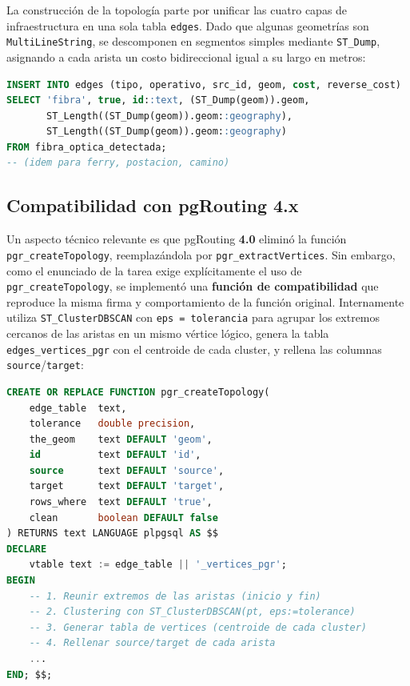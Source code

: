 \documentclass[12pt,a4paper]{article}
\begin{document}
La construcción de la topología parte por unificar las cuatro capas de
infraestructura en una sola tabla \texttt{edges}.  Dado que algunas
geometrías son \texttt{MultiLineString}, se descomponen en segmentos
simples mediante \texttt{ST\_Dump}, asignando a cada arista un costo
bidireccional igual a su largo en metros:

\begin{lstlisting}[language=SQL,caption={Tabla unificada de aristas (02\_topologia.sql)}]
INSERT INTO edges (tipo, operativo, src_id, geom, cost, reverse_cost)
SELECT 'fibra', true, id::text, (ST_Dump(geom)).geom,
       ST_Length((ST_Dump(geom)).geom::geography),
       ST_Length((ST_Dump(geom)).geom::geography)
FROM fibra_optica_detectada;
-- (idem para ferry, postacion, camino)
\end{lstlisting}

\subsection{Compatibilidad con pgRouting 4.x}

Un aspecto técnico relevante es que pgRouting \textbf{4.0} eliminó la
función \texttt{pgr\_createTopology}, reemplazándola por
\texttt{pgr\_extractVertices}.  Sin embargo, como el enunciado de la tarea
exige explícitamente el uso de \texttt{pgr\_createTopology}, se implementó
una \textbf{función de compatibilidad} que reproduce la misma firma y
comportamiento de la función original.  Internamente utiliza
\texttt{ST\_ClusterDBSCAN} con \texttt{eps = tolerancia} para agrupar los
extremos cercanos de las aristas en un mismo vértice lógico, genera la
tabla \texttt{edges\_vertices\_pgr} con el centroide de cada cluster, y
rellena las columnas \texttt{source}/\texttt{target}:

\begin{lstlisting}[language=SQL,caption={Función de compatibilidad pgr\_createTopology (fragmento)}]
CREATE OR REPLACE FUNCTION pgr_createTopology(
    edge_table  text,
    tolerance   double precision,
    the_geom    text DEFAULT 'geom',
    id          text DEFAULT 'id',
    source      text DEFAULT 'source',
    target      text DEFAULT 'target',
    rows_where  text DEFAULT 'true',
    clean       boolean DEFAULT false
) RETURNS text LANGUAGE plpgsql AS $$
DECLARE
    vtable text := edge_table || '_vertices_pgr';
BEGIN
    -- 1. Reunir extremos de las aristas (inicio y fin)
    -- 2. Clustering con ST_ClusterDBSCAN(pt, eps:=tolerance)
    -- 3. Generar tabla de vertices (centroide de cada cluster)
    -- 4. Rellenar source/target de cada arista
    ...
END; $$;
\end{lstlisting}
\end{document}
